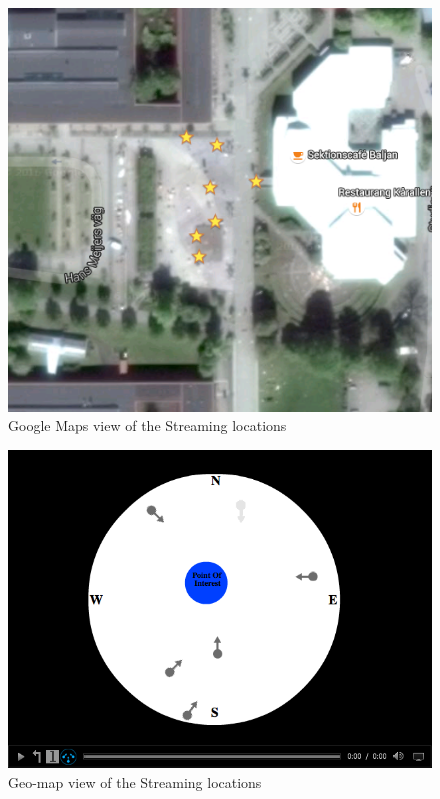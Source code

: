 \documentclass[9pt,a4paper]{acmproc}
\begin{document}
\begin{figure}[ht!]
\begin{center}
	\includegraphics[scale=0.64]{Google_Maps.png}
	\caption{Google Maps view of the Streaming locations}
	\label{fig:googlemaps}
\end{center}
\end{figure}

\begin{figure}[ht!]
\begin{center}
	\includegraphics[scale=0.37]{TestfallGeomap.png}
	\caption{Geo-map view of the Streaming locations}
	\label{fig:testfallgeomap}
\end{center}
\end{figure}
\end{document}
